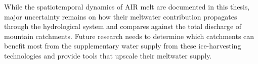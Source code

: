While the spatiotemporal dynamics of \ac{AIR} melt are documented in this thesis,
major uncertainty remains on how their meltwater contribution propagates through the hydrological system and
compares against the total discharge of mountain catchments. Future research needs to determine which catchments
can benefit most from the supplementary water supply from these ice-harvesting technologies and provide tools that
upscale their meltwater supply.

